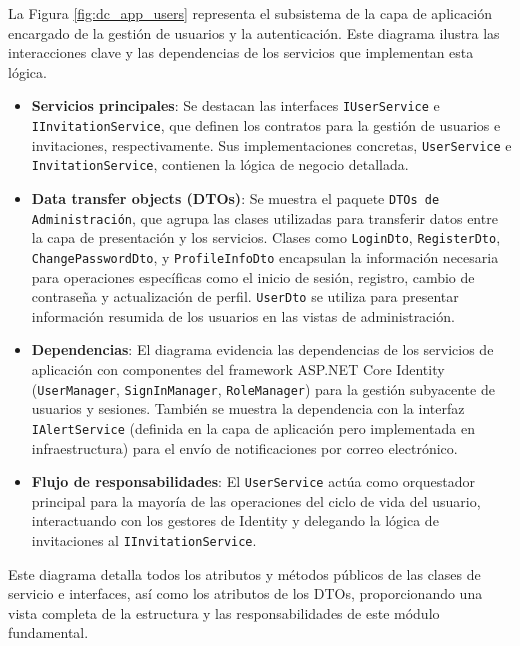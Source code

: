 La Figura \ref{fig:dc_app_users} representa el subsistema de la capa de aplicación encargado de la gestión de usuarios y la autenticación. Este diagrama ilustra las interacciones clave y las dependencias de los servicios que implementan esta lógica.
\begin{itemize}
    \item \textbf{Servicios principales}: Se destacan las interfaces \texttt{IUserService} e \texttt{IInvitationService}, que definen los contratos para la gestión de usuarios e invitaciones, respectivamente. Sus implementaciones concretas, \texttt{UserService} e \texttt{InvitationService}, contienen la lógica de negocio detallada.
    \item \textbf{Data transfer objects (DTOs)}: Se muestra el paquete \texttt{DTOs de Administración}, que agrupa las clases utilizadas para transferir datos entre la capa de presentación y los servicios. Clases como \texttt{LoginDto}, \texttt{RegisterDto}, \texttt{ChangePasswordDto}, y \texttt{ProfileInfoDto} encapsulan la información necesaria para operaciones específicas como el inicio de sesión, registro, cambio de contraseña y actualización de perfil. \texttt{UserDto} se utiliza para presentar información resumida de los usuarios en las vistas de administración.
    \item \textbf{Dependencias}: El diagrama evidencia las dependencias de los servicios de aplicación con componentes del framework ASP.NET Core Identity (\texttt{UserManager}, \texttt{SignInManager}, \texttt{RoleManager}) para la gestión subyacente de usuarios y sesiones. También se muestra la dependencia con la interfaz \texttt{IAlertService} (definida en la capa de aplicación pero implementada en infraestructura) para el envío de notificaciones por correo electrónico.
    \item \textbf{Flujo de responsabilidades}: El \texttt{UserService} actúa como orquestador principal para la mayoría de las operaciones del ciclo de vida del usuario, interactuando con los gestores de Identity y delegando la lógica de invitaciones al \texttt{IInvitationService}.
\end{itemize}

Este diagrama detalla todos los atributos y métodos públicos de las clases de servicio e interfaces, así como los atributos de los DTOs, proporcionando una vista completa de la estructura y las responsabilidades de este módulo fundamental.



